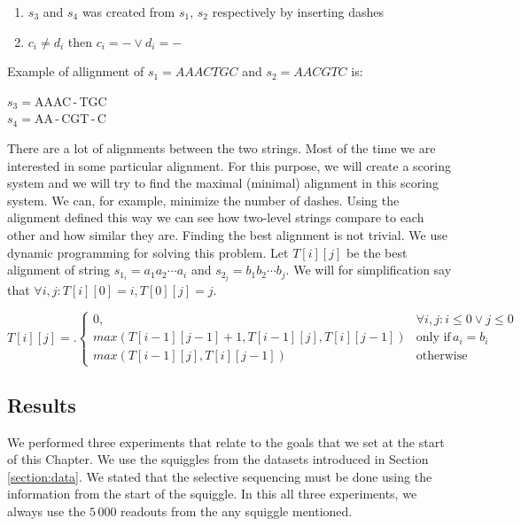 \begin{enumerate}
\item $s_3$ and $s_4$ was created from $s_1$, $s_2$ respectively by inserting dashes
\item $c_i \neq d_i$ then $c_i = - \lor d_i = -$
\end{enumerate}

Example of allignment of $s_1 = AAACTGC$ and $s_2 = AACGTC$ is:

\begin{center}
$s_3 = $AAAC\,-\,TGC\\
$s_4 = $AA\,-\,CGT\,-\,C
\end{center}

There are a lot of alignments between the two strings. Most of the time we
are interested in some particular alignment. For this purpose, we will create a
scoring system and we will try to find the maximal (minimal) alignment in this scoring
system. We can, for example, minimize the number of dashes. Using the alignment
defined this way we can see how two-level strings compare to each other and how similar they are.
Finding the best alignment is not trivial. We use dynamic programming for
solving this problem. Let $T[i][j]$ be the best alignment of string $s_{1_i} = a_1a_2\cdots a_i$
and $s_{2_j} = b_1b_2\cdots b_j$. We will for simplification say that $\forall i, j: T[i][0] = i, T[0][j] = j$.

\[
T[i][j] = \bigl.
  \begin{cases}
    0, & \forall i,j : i\leq 0 \lor j\leq 0 \\
    max(T[i-1][j-1] + 1, T[i-1][j], T[i][j-1]) & \text{only if} \, a_i = b_i \\ 
    max(T[i-1][j], T[i][j-1]) & \text{otherwise}
  \end{cases}
\]

\subsection{Results}
\label{section:results}

We performed three experiments that relate to the goals that we set at the start
of this Chapter. We use the squiggles from the datasets introduced in Section
\ref{section:data}. We stated that the selective sequencing must be done using
the information from the start of the squiggle. In this all three experiments, we always use
the $5\,000$ readouts from the any squiggle mentioned. 

